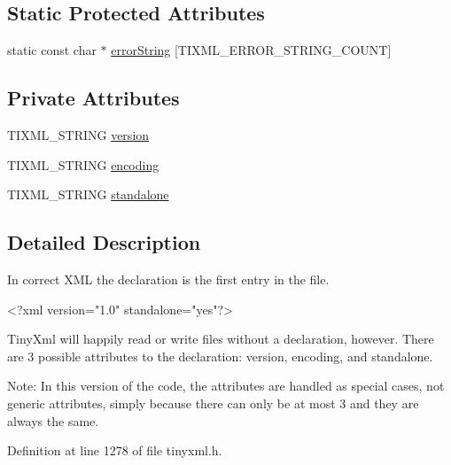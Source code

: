\subsection*{Static Protected Attributes}
\begin{DoxyCompactItemize}
\item 
static const char $\ast$ \hyperlink{classTiXmlBase_a7ac8feec4100e446b3d78e1ac0659700}{errorString} \mbox{[}TIXML\_\-ERROR\_\-STRING\_\-COUNT\mbox{]}
\end{DoxyCompactItemize}
\subsection*{Private Attributes}
\begin{DoxyCompactItemize}
\item 
TIXML\_\-STRING \hyperlink{classTiXmlDeclaration_ab9eb14dc9cb78e3a8a0636d5d6a5d04d}{version}
\item 
TIXML\_\-STRING \hyperlink{classTiXmlDeclaration_a24b8645d7696ec169bbb3fb7d30860cf}{encoding}
\item 
TIXML\_\-STRING \hyperlink{classTiXmlDeclaration_a52524bf1a0726104350fe4121d7fdff4}{standalone}
\end{DoxyCompactItemize}


\subsection{Detailed Description}
In correct XML the declaration is the first entry in the file. \begin{DoxyVerb}
		<?xml version="1.0" standalone="yes"?>
	\end{DoxyVerb}


TinyXml will happily read or write files without a declaration, however. There are 3 possible attributes to the declaration: version, encoding, and standalone.

Note: In this version of the code, the attributes are handled as special cases, not generic attributes, simply because there can only be at most 3 and they are always the same. 

Definition at line 1278 of file tinyxml.h.



